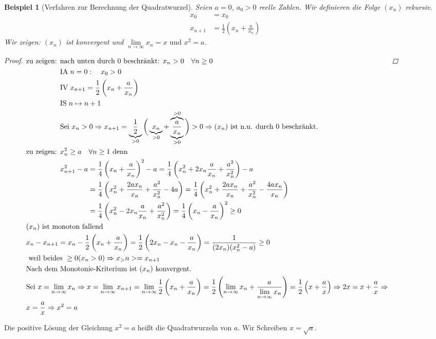 \documentclass[a4paper,titlepage,oneside]{article}
\def\zz{\text{zu zeigen: }}
\newcommand{\IA}[1][n=0]{\vspace{0.1pt}\ensuremath{\text{IA}\sp#1:}}
\newcommand{\IV}{\vspace{0.1pt}\ensuremath{\text{IV}\sp}}
\newcommand{\IS}[1][n \mapsto n+1]{\vspace{0.1pt}\ensuremath{\text{IS}\sp#1}}
\def\sp{\hspace{0,1cm}}
\renewcommand{\liminf}[2][n]{\ensuremath{\lim\limits_{#1 \rightarrow \infty}{#2}}}
\theoremstyle{thmstyle}
\newtheorem{bsp}[satz]{Beispiel}
\begin{document}
\begin{bsp}[Verfahren zur Berechnung der Quadratwurzel]
Seien \(a = 0\), \(a_0 > 0\) reelle Zahlen. Wir definieren die Folge \((x_n)\) rekursiv.
\begin{align*}
x_0 &= x_0 \\
x_{n+1} &= \frac{1}{2}\left(x_n + \frac{a}{x_n}\right)
\end{align*}
Wir zeigen: \((x_n)\) ist konvergent und \(\liminf{x_n} = x \text{ und } x^2 = a\).
\begin{proof}$\begin{aligned}[t]
&\zz \begin{aligned}[t] &\text{nach unten durch $0$ beschränkt: } x_n > 0 \quad \forall n \ge 0 \\
&\IA \quad  x_0 > 0 \\
&\IV x_{n+1} = \frac{1}{2}\left(x_n + \frac{a}{x_n}\right) \\
&\IS \\
&\text{Sei } x_n > 0 \Rightarrow x_{n+1} = \underbrace{\frac{1}{2}}_{> 0}\bigg( \underbrace{x_n}_{> 0} + \underbrace{\overbrace{\frac{a}{x_n}}^{> 0}}_{>0}\bigg) > 0 \Rightarrow (x_n) \text{ ist n.u. durch $0$ beschränkt.} \end{aligned} \\
&\zz \begin{aligned}[t] &x_n^2 \ge a \quad \forall n \ge 1 \text{ denn } \\
&x_{n+1}^2 - a \begin{aligned}[t] &= \frac{1}{4}\left(x_n + \frac{a}{x_n}\right)^2  - a = \frac{1}{4}\left(x_n^2 + 2x_n\frac{a}{x_n} + \frac{a^2}{x_n^2} \right) - a \\
&= \frac{1}{4}\left(x_n^2 + \frac{2ax_n}{x_n} + \frac{a^2}{x_n^2} - 4a \right) = \frac{1}{4} \left(x_n^2 + \frac{2ax_n}{x_n} + \frac{a^2}{x_n^2} -\frac{4ax_n}{x_n} \right)\\
&= \frac{1}{4} \left(x_n^2 - 2x_n\frac{a}{x_n} + \frac{a^2}{x_n^2} \right) = \frac{1}{4} \left(x_n - \frac{a}{x_n} \right)^2 \ge 0
\end{aligned}
\end{aligned} \\
&(x_n)\text{ ist monoton fallend} \\ %
&x_n - x_{n+1} = x_n - \frac{1}{2} \left(x_n + \frac{a}{x_n}\right) =\frac{1}{2} \left(2x_n - x_n - \frac{a}{x_n}\right) = \frac{1}{(2x_n)(x_n^2 - a)} \ge 0 \\
&\text{ weil beides } \ge 0 (x_n > 0) \Rightarrow x_>n >= x_{n+1} \\
&\text{Nach dem Monotonie-Kriterium ist $(x_n)$ konvergent.} \\
&\text{Sei } x= \liminf{x_n} \Rightarrow x = \liminf{x_{n+1}} = \liminf{\frac{1}{2}\left(x_n + \frac{a}{x_n}\right)} = \frac{1}{2}\left(\liminf{x_n} + \frac{a}{\liminf{x_n}}\right) =  \frac{1}{2}\left(x + \frac{a}{x}\right) \Rightarrow 2x = x + \frac{a}{x} \Rightarrow  \\
&x = \frac{a}{x} \Rightarrow x^2 = a
\end{aligned}$
\end{proof}
\end{bsp}
Die positive Lösung der Gleichung \(x^2 = a\) heißt die Quadratwurzeln von \(a\). Wir Schreiben \(x = \sqrt{a}\).
\end{document}
